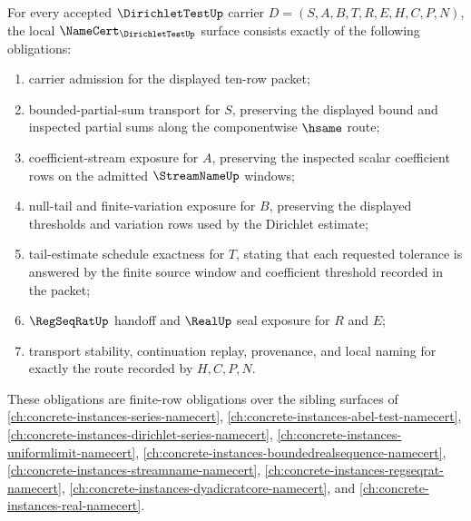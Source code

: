 \begin{theorem}
\label{thm:dirichlet-test-namecert-obligations}
For every accepted $\DirichletTestUp$ carrier $D=(S,A,B,T,R,E,H,C,P,N)$, the local $\NameCert_{\DirichletTestUp}$ surface consists exactly of the following obligations:
\begin{enumerate}
\item carrier admission for the displayed ten-row packet;
\item bounded-partial-sum transport for $S$, preserving the displayed bound and inspected partial sums along the componentwise $\hsame$ route;
\item coefficient-stream exposure for $A$, preserving the inspected scalar coefficient rows on the admitted $\StreamNameUp$ windows;
\item null-tail and finite-variation exposure for $B$, preserving the displayed thresholds and variation rows used by the Dirichlet estimate;
\item tail-estimate schedule exactness for $T$, stating that each requested tolerance is answered by the finite source window and coefficient threshold recorded in the packet;
\item $\RegSeqRatUp$ handoff and $\RealUp$ seal exposure for $R$ and $E$;
\item transport stability, continuation replay, provenance, and local naming for exactly the route recorded by $H,C,P,N$.
\end{enumerate}
These obligations are finite-row obligations over the sibling surfaces of \autoref{ch:concrete-instances-series-namecert}, \autoref{ch:concrete-instances-abel-test-namecert}, \autoref{ch:concrete-instances-dirichlet-series-namecert}, \autoref{ch:concrete-instances-uniformlimit-namecert}, \autoref{ch:concrete-instances-boundedrealsequence-namecert}, \autoref{ch:concrete-instances-streamname-namecert}, \autoref{ch:concrete-instances-regseqrat-namecert}, \autoref{ch:concrete-instances-dyadicratcore-namecert}, and \autoref{ch:concrete-instances-real-namecert}.
\end{theorem}
